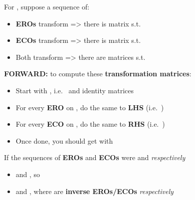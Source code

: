 For , suppose a sequence of:

\begin{itemize}

      \item
            \textbf{EROs} transform
             =>
            there is matrix  s.t. 
      \item
            \textbf{ECOs} transform
             =>
            there is matrix  s.t. 
      \item
            Both transform
            => there are matrices  s.t. 
\end{itemize}

\hSep %

\textbf{FORWARD:} to compute these \textbf{transformation matrices}:

\begin{itemize}

      \item
            Start with \iMbox{[I_{m} \ | \ A \ | \ I_{n}]}, i.e.~ and
            identity matrices
      \item
            For every \textbf{ERO} on , do the same to \textbf{LHS}
            (i.e.~)
      \item
            For every \textbf{ECO} on , do the same to \textbf{RHS}
            (i.e.~)
      \item
            Once done, you should get
            \iMbox{\ds [I_{m} \ | \ A \ | \ I_{n}] \rightsquigarrow [R \ | \ A' \ | \ C]}
            with 
\end{itemize}

\hSep %

If the sequences of \textbf{EROs} and \textbf{ECOs} were
 and
 \emph{respectively}

\begin{itemize}

      \item
             and
            , so
      \item
             and
            , where
             are \textbf{inverse EROs/ECOs}
            \emph{respectively}
\end{itemize}

